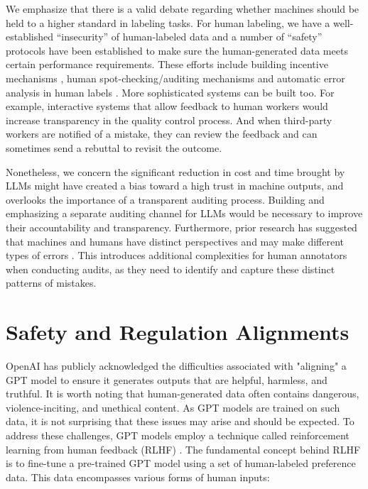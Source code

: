 \documentclass{article}
\begin{document}
We emphasize that there is a valid debate regarding whether machines should be held to a higher standard in labeling tasks. For human labeling, we have a well-established “insecurity” of human-labeled data and a number of “safety” protocols have been established to make sure the human-generated data meets certain performance requirements. These efforts include building incentive mechanisms \cite{liu2016learning,Witkowski_hcomp13}, human spot-checking/auditing mechanisms \cite{shah2015double} and automatic error analysis in human labels \cite{zhu2022detecting,zhu2021clusterability}. More sophisticated systems can be built too. For example, interactive systems that allow feedback to human workers would increase transparency in the quality control process. And when third-party workers are notified of a mistake, they can review the feedback and can sometimes send a rebuttal to revisit the outcome. %

Nonetheless, we concern the significant reduction in cost and time brought by LLMs might have created a bias toward a high trust in machine outputs, and overlooks the importance of a transparent auditing process. Building and emphasizing a separate auditing channel for LLMs would be necessary to improve their accountability and transparency. Furthermore, prior research has suggested that machines and humans have distinct perspectives and may make different types of errors \cite{liu2023humans}. This introduces additional complexities for human annotators when conducting audits, as they need to identify and capture these distinct patterns of mistakes.



\section{Safety and Regulation Alignments 
}
\label{sec:safe}


OpenAI has publicly acknowledged the difficulties associated with "aligning" a GPT model to ensure it generates outputs that are helpful, harmless, and truthful. It is worth noting that human-generated data often contains dangerous, violence-inciting, and unethical content. As GPT models are trained on such data, it is not surprising that these issues may arise and should be expected. To address these challenges, GPT models employ a technique called reinforcement learning from human feedback (RLHF) \cite{christiano2017deep}. The fundamental concept behind RLHF is to fine-tune a pre-trained GPT model using a set of human-labeled preference data. This data encompasses various forms of human inputs:
\end{document}

